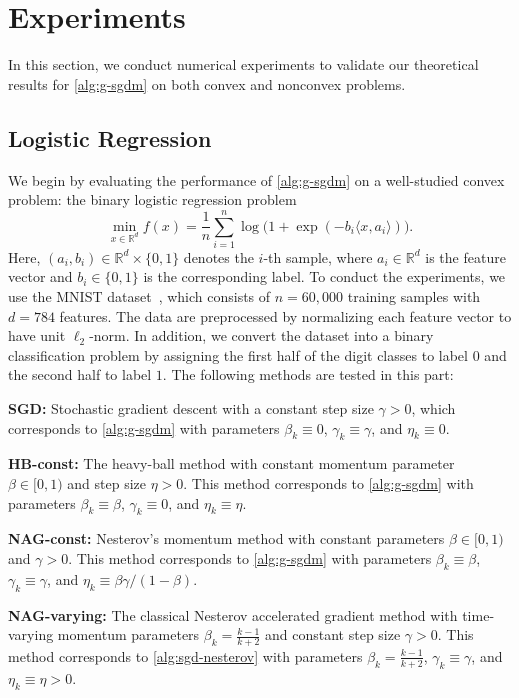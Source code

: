 \documentclass[10pt]{article}
\numberwithin{equation}{section}
\theoremstyle{definition}
\newcommand{\rbb}{\mathbb{R}}  %
\begin{document}
\section{Experiments}
\label{sec:experiments}
In this section, we conduct numerical experiments to validate our theoretical results for \eqref{alg:g-sgdm} on both convex and nonconvex problems.

\subsection{Logistic Regression}
We begin by evaluating the performance of \eqref{alg:g-sgdm} on a well-studied convex problem: the binary logistic regression problem
\begin{equation}\label{prob:logistic}
\min_{x \in \rbb^d} f(x) = \frac{1}{n} \sum_{i=1}^n \log\big(1 + \exp(-b_i \langle x, a_i \rangle)\big).
\end{equation}
Here, $(a_i, b_i)\in \rbb^d\times \{0,1\}$ denotes the $i$-th sample, where $a_i\in\rbb^d$ is the feature vector and $b_i\in\{0,1\}$ is the corresponding label.
To conduct the experiments, we use the MNIST dataset~\citep{lecun2002gradient}, which consists of $n=60{,}000$ training samples with $d=784$ features. The data are preprocessed by normalizing each feature vector to have unit $\ell_2$-norm. In addition, we convert the dataset into a binary classification problem by assigning the first half of the digit classes to label $0$ and the second half to label $1$. The following methods are tested in this part:

\textbf{SGD:} Stochastic gradient descent with a constant step size $\gamma>0$, which corresponds to \eqref{alg:g-sgdm} with parameters $\beta_k\equiv 0$, $\gamma_k\equiv\gamma$, and $\eta_k\equiv 0$.

\textbf{HB-const:} The heavy-ball method with constant momentum parameter $\beta\in[0,1)$ and step size $\eta>0$. This method corresponds to \eqref{alg:g-sgdm} with parameters $\beta_k\equiv \beta$, $\gamma_k\equiv 0$, and $\eta_k\equiv \eta$.

\textbf{NAG-const:} Nesterov’s momentum method with constant parameters $\beta\in[0,1)$ and $\gamma>0$. This method corresponds to \eqref{alg:g-sgdm} with parameters $\beta_k\equiv \beta$, $\gamma_k\equiv \gamma$, and $\eta_k\equiv \beta\gamma/(1-\beta)$.

\textbf{NAG-varying:} The classical Nesterov accelerated gradient method with time-varying momentum parameters $\beta_k=\frac{k-1}{k+2}$ and constant step size $\gamma>0$. This method corresponds to \eqref{alg:sgd-nesterov} with parameters $\beta_k=\frac{k-1}{k+2}$, $\gamma_k\equiv \gamma$, and $\eta_k\equiv \eta>0$.
\end{document}

